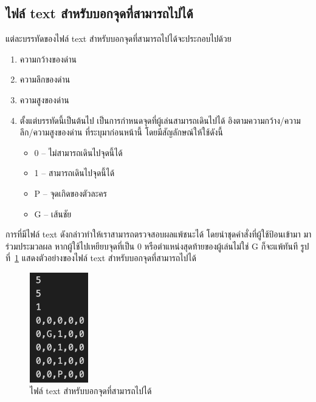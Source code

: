 \subsection{ไฟล์ text สำหรับบอกจุดที่สามารถไปได้}
แต่ละบรรทัดของไฟล์ text สำหรับบอกจุดที่สามารถไปได้จะประกอบไปด้วย
\begin{enumerate}
    \item ความกว้างของด่าน
    \item ความลึกของด่าน
    \item ความสูงของด่าน
    \item ตั้งแต่บรรทัดนี้เป็นต้นไป เป็นการกำหนดจุดที่ผู้เล่นสามารถเดินไปได้ อิงตามความกว้าง/ความลึก/ความสูงของด่าน ที่ระบุมาก่อนหน้านี้ โดยมีสัญลักษณ์ให้ใช้ดังนี้
    \begin{itemize}
        \item 0 -- ไม่สามารถเดินไปจุดนี้ได้
        \item 1 -- สามารถเดินไปจุดนี้ได้
        \item P -- จุดเกิดของตัวละคร
        \item G -- เส้นชัย
    \end{itemize}
\end{enumerate}
การที่มีไฟล์ text ดังกล่าวทำให้เราสามารถตรวจสอบผลแพ้ชนะได้ โดยนำชุดคำสั่งที่ผู้ใช้ป้อนเข้ามา มาร่วมประมวลผล หากผู้ใช้ไปเหยียบจุดที่เป็น 0
หรือตำแหน่งสุดท้ายของผู้เล่นไม่ใช่ G ก็จะแพ้ทันที รูปที่~\ref{ft2} แสดงตัวอย่างของไฟล์ text สำหรับบอกจุดที่สามารถไปได้
\begin{figure}[H]
    \begin{center}
    \includegraphics[width=1in]{pic-toro/filetext1.png}
    \end{center}
    \caption[ไฟล์ text สำหรับบอกจุดที่สามารถไปได้]{ไฟล์ text สำหรับบอกจุดที่สามารถไปได้}
    \label{ft2}
    \end{figure}
